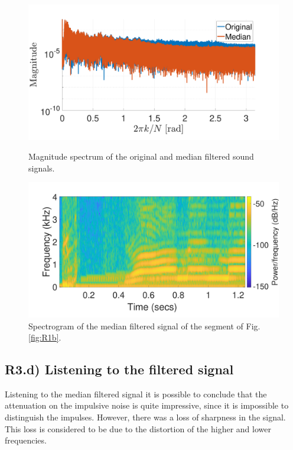 \documentclass[a4paper, oneside, 11pt]{article}
\begin{document}
\begin{figure}[htbp]
	\begin{minipage}[b]{.49\textwidth}
		\centering
		\includegraphics[width= 1.1\textwidth]{figures/dft_comp_median.pdf}
		\caption{Magnitude spectrum of the original and median filtered sound signals.}
		\label{fig:dft_comp_median}
	\end{minipage}
	\hfill
	\begin{minipage}[b]{.49\textwidth}
		\centering
		\includegraphics[width= 1.1\textwidth]{figures/spectrogram_median.pdf}
		\caption{Spectrogram of the median filtered signal of the segment of Fig. \ref{fig:R1b}.}
		\label{fig:spectrogram_median}
	\end{minipage}
\end{figure}

\subsection{R3.d) Listening to the filtered signal}

Listening to the median filtered signal it is possible to conclude that the attenuation on the impulsive noise is quite impressive, since it is impossible to distinguish the impulses. However, there was a loss of sharpness in the signal. This loss is considered to be due to the distortion of the higher and lower frequencies.
\end{document}
